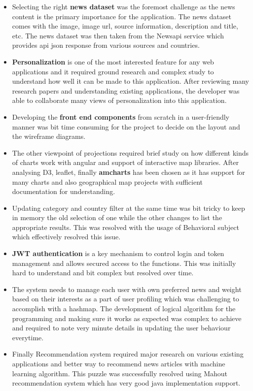 \begin{itemize}
    \item Selecting the right \textbf{news dataset} was the foremost challenge as the news content is the primary importance for the application. The news dataset comes with the image, image url, source information, description and title, etc.
    The news dataset was then taken from the Newsapi service which provides api json response from various sources and countries. 
    
    \item \textbf{Personalization} is one of the most interested feature for any web applications and it required ground research and complex study to understand how well it can be made to this application. After reviewing many research papers and understanding existing applications, the developer was able to collaborate many views of personalization into this application.
    
    \item Developing the\textbf{ front end components} from scratch in a user-friendly manner was bit time consuming for the project to decide on the layout and the wireframe diagrams.
    
    \item The other viewpoint of projections required brief study on how different kinds of charts work with angular and support of interactive map libraries. After analysing D3, leaflet, finally \textbf{amcharts} has been chosen as it has support for many charts and also geographical map projects with sufficient documentation for understanding. 
    
    \item Updating category and country filter at the same time was bit tricky to keep in memory the old selection of one while the other changes to list the appropriate results. This was resolved with the usage of Behavioral subject which effectively resolved this issue.
    
    \item \textbf{JWT authentication} is a key mechanism to control login and token management and allows secured access to the functions. This was initially hard to understand and bit complex but resolved over time.
    
    \item The system needs to manage each user with own preferred news and weight based on their interests as a part of user profiling which was challenging to accomplish with a hashmap. The development of logical algorithm for the programming and making sure it works as expected was complex to achieve and required to note very minute details in updating the user behaviour everytime.
    
    \item Finally Recommendation system required major research on various existing applications and better way to recommend news articles with machine learning algorithm. This puzzle was successfully resolved using Mahout recommendation system which has very good java implementation support.
    
\end{itemize}


